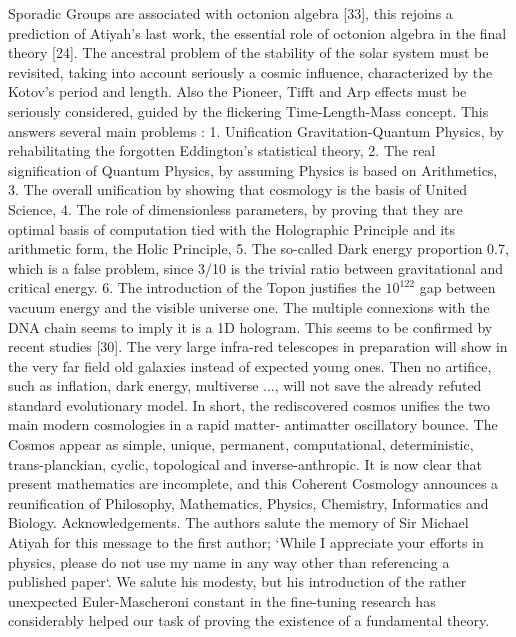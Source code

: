 \documentclass[twoside,draft]{article}
\begin{document}
{Sporadic Groups are associated with octonion algebra [33], this rejoins a prediction of Atiyah's last
work, the essential role of octonion algebra in the final theory [24].
The ancestral problem of the stability of the solar system must be revisited, taking into account
seriously a cosmic influence, characterized by the Kotov's period and length. Also the Pioneer, Tifft
and Arp effects must be seriously considered, guided by the flickering Time-Length-Mass concept.
This answers several main problems : 1. Unification Gravitation-Quantum Physics, by
rehabilitating the forgotten Eddington's statistical theory, 2. The real signification of Quantum
Physics, by assuming Physics is based on Arithmetics, 3. The overall unification by showing that
cosmology is the basis of United Science, 4. The role of dimensionless parameters, by proving that
they are optimal basis of computation tied with the Holographic Principle and its arithmetic form,
the Holic Principle, 5. The so-called Dark energy proportion 0.7, which is a false problem, since
3/10 is the trivial ratio between gravitational and critical energy. 6. The introduction of the Topon
justifies the $10^{122}$ gap between vacuum energy and the visible universe one.
The multiple connexions with the DNA chain seems to imply it is a 1D hologram. This seems to
be confirmed by recent studies [30].
The very large infra-red telescopes in preparation will show in the very far field old galaxies
instead of expected young ones. Then no artifice, such as inflation, dark energy, multiverse ..., will
not save the already refuted standard evolutionary model.
In short, the rediscovered cosmos unifies the two main modern cosmologies in a rapid matter-
antimatter oscillatory bounce. The Cosmos appear as simple, unique, permanent, computational,
deterministic, trans-planckian, cyclic, topological and inverse-anthropic.
It is now clear that present mathematics are incomplete, and this Coherent Cosmology
announces a reunification of Philosophy, Mathematics, Physics, Chemistry, Informatics and
Biology.
Acknowledgements. The authors salute the memory of Sir Michael Atiyah for this message to the
first author; `While I appreciate your efforts in physics, please do not use my name in any way
other than referencing a published paper`. We salute his modesty, but his introduction of the rather
unexpected Euler-Mascheroni constant in the fine-tuning research has considerably helped our task
of proving the existence of a fundamental theory.

}
\end{document}
